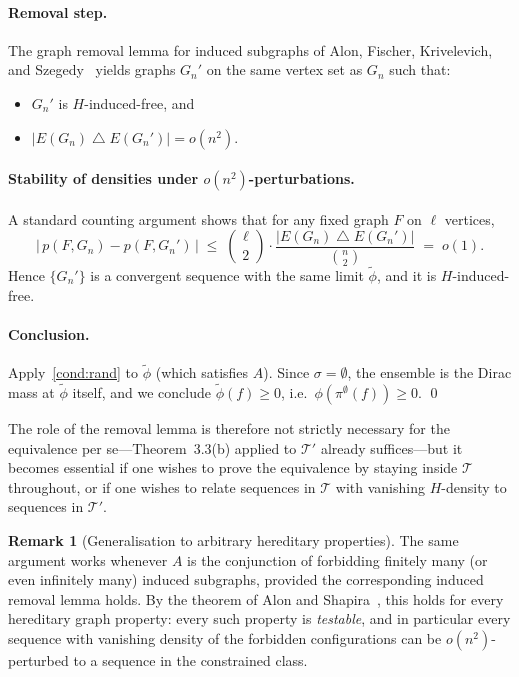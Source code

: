 \documentclass[11pt]{article}
\theoremstyle{definition}
\newtheorem{remark}[theorem]{Remark}
\newcommand{\T}{\mathcal{T}}
\begin{document}
\paragraph{Removal step.} The graph removal lemma for induced subgraphs of
Alon, Fischer, Krivelevich, and Szegedy~\cite{AFKS2000} yields graphs
$G_n'$ on the same vertex set as $G_n$ such that:
\begin{itemize}[leftmargin=2em]
  \item $G_n'$ is $H$-induced-free, and
  \item $|E(G_n) \mathbin{\triangle} E(G_n')| = o(n^2)$.
\end{itemize}

\paragraph{Stability of densities under $o(n^2)$-perturbations.}
A standard counting argument shows that for any fixed graph $F$ on $\ell$
vertices,
\[
  \bigl|\,p(F, G_n) - p(F, G_n')\,\bigr|
  \;\leq\;
  \binom{\ell}{2} \cdot
  \frac{|E(G_n) \mathbin{\triangle} E(G_n')|}{\binom{n}{2}}
  \;=\; o(1).
\]
Hence $\{G_n'\}$ is a convergent sequence with the same limit
$\widetilde{\phi}$, and it is $H$-induced-free.

\paragraph{Conclusion.} Apply~\ref{cond:rand} to $\widetilde{\phi}$ (which
satisfies $A$). Since $\sigma = \emptyset$, the ensemble is the Dirac mass at
$\widetilde{\phi}$ itself, and we conclude $\widetilde{\phi}(f) \geq 0$,
i.e.\ $\phi(\pi^{\emptyset}(f)) \geq 0$. \qed

\medskip

The role of the removal lemma is therefore not strictly necessary for the
equivalence per se---Theorem~3.3(b) applied to $\T'$ already suffices---but it
becomes essential if one wishes to prove the equivalence by staying inside
$\T$ throughout, or if one wishes to relate sequences in $\T$ with vanishing
$H$-density to sequences in $\T'$.

\begin{remark}[Generalisation to arbitrary hereditary properties]
The same argument works whenever $A$ is the conjunction of forbidding finitely
many (or even infinitely many) induced subgraphs, provided the corresponding
induced removal lemma holds. By the theorem of Alon and
Shapira~\cite{AlonShapira2008}, this holds for every hereditary graph
property: every such property is \emph{testable}, and in particular every
sequence with vanishing density of the forbidden configurations can be
$o(n^2)$-perturbed to a sequence in the constrained class.
\end{remark}
\end{document}
